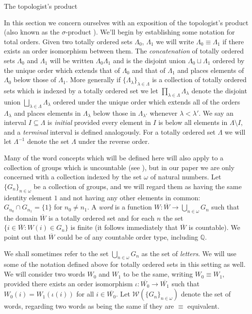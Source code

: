 \documentclass{amsart}
\theoremstyle{definition}\newtheorem{theorem}{Theorem}
\theoremstyle{definition}\newtheorem*{A}{Main Theorem}
\theoremstyle{definition}\newtheorem*{B}{Theorem \ref{elementaryequiv}}
\theoremstyle{definition}\newtheorem*{C}{Theorem \ref{continuous}}
\theoremstyle{definition}\newtheorem*{D}{Theorem \ref{bigisomorphism2}}
\theoremstyle{definition}\newtheorem{bigtheorem}{Main Theorem}
\numberwithin{theorem}{section}
\theoremstyle{definition}\newtheorem{corollary}[theorem]{Corollary}
\theoremstyle{definition}\newtheorem{proposition}[theorem]{Proposition}
\theoremstyle{definition}\newtheorem{definition}[theorem]{Definition}
\theoremstyle{definition}\newtheorem{question}[theorem]{Question}
\theoremstyle{definition}\newtheorem{example}[theorem]{Example}
\theoremstyle{definition}\newtheorem{remark}[theorem]{Remark}
\theoremstyle{definition}\newtheorem{note}[theorem]{Note}
\theoremstyle{definition}\newtheorem{lemma}[theorem]{Lemma}
\theoremstyle{definition}\newtheorem{fact}[theorem]{Fact}
\theoremstyle{definition}\newtheorem{define}[theorem]{Definition}
\theoremstyle{definition}\newtheorem{claim}[theorem]{Claim}
\theoremstyle{definition}\newtheorem{obs}[theorem]{Observation}
\theoremstyle{definition}\newtheorem{definitions}[theorem]{Definitions}
\newcommand{\W}{\mathcal{W}}
\begin{document}
\begin{section}{The topologist's product}\label{topprod}

In this section we concern ourselves with an exposition of the topologist's product (also known as the $\sigma$-product \cite{E}).  We'll begin by establishing some notation for total orders.  Given two totally ordered sets $\Lambda_0$, $\Lambda_1$ we will write $\Lambda_0 \equiv \Lambda_1$ if there exists an order isomorphism between them.  The \emph{concatenation} of totally ordered sets $\Lambda_0$ and $\Lambda_1$ will be written $\Lambda_0\Lambda_1$ and is the disjoint union $\Lambda_0 \sqcup \Lambda_1$ ordered by the unique order which extends that of $\Lambda_0$ and that of $\Lambda_1$ and places elements of $\Lambda_0$ below those of $\Lambda_1$.  More generally if $\{\Lambda_{\lambda}\}_{\lambda \in \Lambda}$ is a collection of totally ordered sets which is indexed by a totally ordered set we let $\prod_{\lambda \in \Lambda} \Lambda_{\lambda}$ denote the disjoint union $\bigsqcup_{\lambda \in \Lambda} \Lambda_{\lambda}$ ordered under the unique order which extends all of the orders $\Lambda_{\lambda}$ and places elements in $\Lambda_{\lambda}$ below those in $\Lambda_{\lambda'}$ whenever $\lambda < \lambda'$.  We say an interval $I \subseteq \Lambda$ is \emph{initial} provided every element in $I$ is below all elements in $\Lambda \setminus I$, and a \emph{terminal} interval is defined analogously.  For a totally ordered set $\Lambda$ we will let $\Lambda^{-1}$ denote the set $\Lambda$ under the reverse order.

Many of the word concepts which will be defined here will also apply to a collection of groups which is uncountable (see \cite{E}), but in our paper we are only concerned with a collection indexed by the set $\omega$ of natural numbers.  Let $\{G_n\}_{n\in \omega}$ be a collection of groups, and we will regard them as having the same identity element $1$ and not having any other elements in common: $G_{n_0} \cap G_{n_1} = \{1\}$ for $n_0 \neq n_1$.  A \emph{word} is a function $W: \overline{W} \rightarrow \bigcup_{n \in \omega} G_n$ such that the domain $\overline{W}$ is a totally ordered set and for each $n$ the set $\{i \in \overline{W} : W(i) \in G_n\}$ is finite (it follows immediately that $\overline{W}$ is countable).  We point out that $\overline{W}$ could be of any countable order type, including $\mathbb{Q}$.

We shall sometimes refer to the set $\bigcup_{n \in \omega} G_n$ as the set of \emph{letters}.  We will use some of the notation defined above for totally ordered sets in this setting as well.  We will consider two words $W_0$ and $W_1$ to be the same, writing $W_0 \equiv W_1$, provided there exists an order isomorphism $\iota: \overline{W_0} \rightarrow \overline{W_1}$ such that $W_0(i) = W_1(\iota(i))$ for all $i \in \overline{W_0}$.  Let $\W(\{G_n\}_{n \in \omega})$ denote the set of words, regarding two words as being the same if they are $\equiv$ equivalent.  


\end{section}
\end{document}
